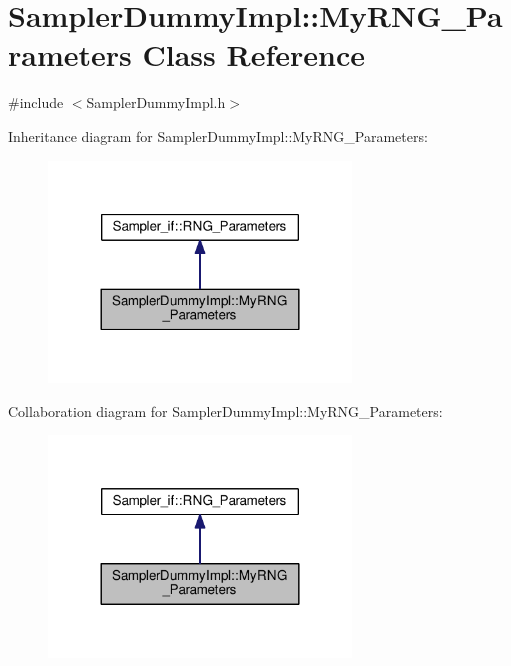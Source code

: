\hypertarget{class_sampler_dummy_impl_1_1_my_r_n_g___parameters}{}\section{Sampler\+Dummy\+Impl\+:\+:My\+R\+N\+G\+\_\+\+Parameters Class Reference}
\label{class_sampler_dummy_impl_1_1_my_r_n_g___parameters}


{\ttfamily \#include $<$Sampler\+Dummy\+Impl.\+h$>$}



Inheritance diagram for Sampler\+Dummy\+Impl\+:\+:My\+R\+N\+G\+\_\+\+Parameters\+:\nopagebreak
\begin{figure}[H]
\begin{center}
\leavevmode
\includegraphics[width=228pt]{class_sampler_dummy_impl_1_1_my_r_n_g___parameters__inherit__graph}
\end{center}
\end{figure}


Collaboration diagram for Sampler\+Dummy\+Impl\+:\+:My\+R\+N\+G\+\_\+\+Parameters\+:\nopagebreak
\begin{figure}[H]
\begin{center}
\leavevmode
\includegraphics[width=228pt]{class_sampler_dummy_impl_1_1_my_r_n_g___parameters__coll__graph}
\end{center}
\end{figure}
